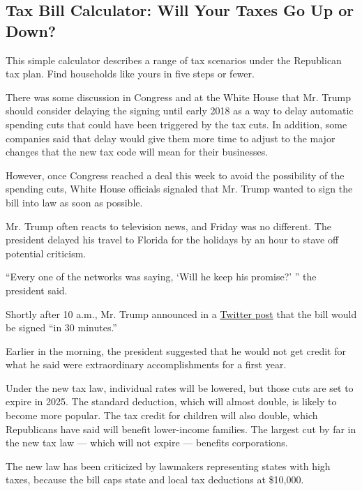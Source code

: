 \hypertarget{tax-bill-calculator-will-your-taxes-go-up-or-down}{%
\subsection{Tax Bill Calculator: Will Your Taxes Go Up or
Down?}\label{tax-bill-calculator-will-your-taxes-go-up-or-down}}

This simple calculator describes a range of tax scenarios under the
Republican tax plan. Find households like yours in five steps or fewer.

There was some discussion in Congress and at the White House that Mr.
Trump should consider delaying the signing until early 2018 as a way to
delay automatic spending cuts that could have been triggered by the tax
cuts. In addition, some companies said that delay would give them more
time to adjust to the major changes that the new tax code will mean for
their businesses.

However, once Congress reached a deal this week to avoid the possibility
of the spending cuts, White House officials signaled that Mr. Trump
wanted to sign the bill into law as soon as possible.

Mr. Trump often reacts to television news, and Friday was no different.
The president delayed his travel to Florida for the holidays by an hour
to stave off potential criticism.

``Every one of the networks was saying, `Will he keep his promise?' ''
the president said.

Shortly after 10 a.m., Mr. Trump announced in a
\href{https://twitter.com/realDonaldTrump/status/944222979147337728}{Twitter
post} that the bill would be signed ``in 30 minutes.''

Earlier in the morning, the president suggested that he would not get
credit for what he said were extraordinary accomplishments for a first
year.

Under the new tax law, individual rates will be lowered, but those cuts
are set to expire in 2025. The standard deduction, which will almost
double, is likely to become more popular. The tax credit for children
will also double, which Republicans have said will benefit lower-income
families. The largest cut by far in the new tax law --- which will not
expire --- benefits corporations.

The new law has been criticized by lawmakers representing states with
high taxes, because the bill caps state and local tax deductions at
\$10,000.

